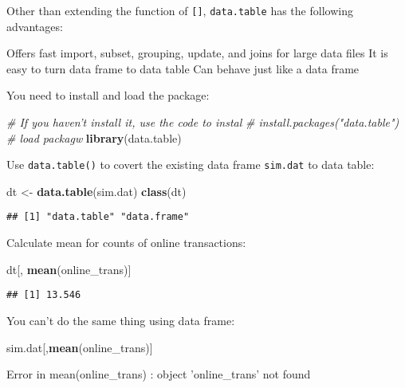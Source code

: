 \documentclass[
]{article}
\newenvironment{Shaded}{\begin{snugshade}}{\end{snugshade}}
\newcommand{\CommentTok}[1]{\textcolor[rgb]{0.56,0.35,0.01}{\textit{#1}}}
\newcommand{\KeywordTok}[1]{\textcolor[rgb]{0.13,0.29,0.53}{\textbf{#1}}}
\newcommand{\NormalTok}[1]{#1}
\newcommand{\StringTok}[1]{\textcolor[rgb]{0.31,0.60,0.02}{#1}}
\begin{document}
Other than extending the function of \texttt{{[}{]}},
\texttt{data.table} has the following advantages:

Offers fast import, subset, grouping, update, and joins for large data
files It is easy to turn data frame to data table Can behave just like a
data frame

You need to install and load the package:

\begin{Shaded}
\begin{Highlighting}[]
\CommentTok{# If you haven't install it, use the code to instal}
\CommentTok{# install.packages("data.table")}
\CommentTok{# load packagw}
\KeywordTok{library}\NormalTok{(data.table)}
\end{Highlighting}
\end{Shaded}

Use \texttt{data.table()} to covert the existing data frame
\texttt{sim.dat} to data table:

\begin{Shaded}
\begin{Highlighting}[]
\NormalTok{dt <-}\StringTok{ }\KeywordTok{data.table}\NormalTok{(sim.dat)}
\KeywordTok{class}\NormalTok{(dt)}
\end{Highlighting}
\end{Shaded}

\begin{verbatim}
## [1] "data.table" "data.frame"
\end{verbatim}

Calculate mean for counts of online transactions:

\begin{Shaded}
\begin{Highlighting}[]
\NormalTok{dt[, }\KeywordTok{mean}\NormalTok{(online_trans)]}
\end{Highlighting}
\end{Shaded}

\begin{verbatim}
## [1] 13.546
\end{verbatim}

You can't do the same thing using data frame:

\begin{Shaded}
\begin{Highlighting}[]
\NormalTok{sim.dat[,}\KeywordTok{mean}\NormalTok{(online_trans)]}
\end{Highlighting}
\end{Shaded}

\begin{Shaded}
\begin{Highlighting}[]
\NormalTok{Error in mean(online_trans) : object 'online_trans' not found}
\end{Highlighting}
\end{Shaded}
\end{document}
